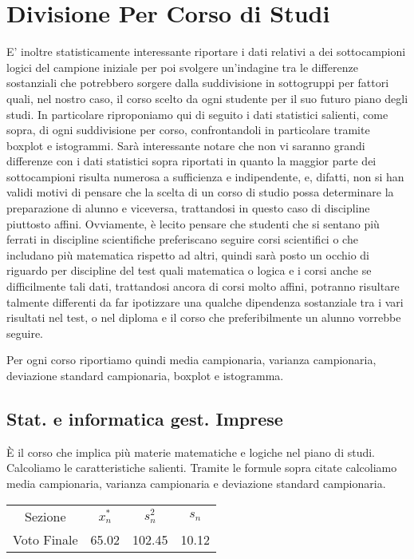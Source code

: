 \section{Divisione Per Corso di Studi}

E’ inoltre statisticamente interessante riportare i dati relativi a dei sottocampioni logici del campione iniziale per poi svolgere un’indagine tra le differenze sostanziali che potrebbero sorgere dalla suddivisione in sottogruppi per fattori quali, nel nostro caso, il corso scelto da ogni studente per il suo futuro piano degli studi.  In particolare riproponiamo qui di seguito i dati statistici salienti, come sopra, di ogni suddivisione per corso, confrontandoli in particolare tramite boxplot e istogrammi. Sarà interessante notare che non vi saranno grandi differenze con i dati statistici sopra riportati in quanto la maggior parte dei sottocampioni risulta numerosa a sufficienza e indipendente, e, difatti, non si han validi motivi di pensare che la scelta di un corso di studio possa determinare la preparazione di alunno e  viceversa, trattandosi in questo caso di discipline piuttosto affini. Ovviamente, è lecito pensare che studenti che si sentano più ferrati in discipline scientifiche preferiscano seguire corsi scientifici o che includano più matematica rispetto ad altri, quindi sarà posto un occhio di riguardo per discipline del test quali matematica o logica e i corsi anche se difficilmente tali dati, trattandosi ancora di corsi molto affini, potranno risultare talmente differenti da far ipotizzare una qualche dipendenza sostanziale tra i vari risultati nel test, o nel diploma e il corso che preferibilmente un alunno vorrebbe seguire. 

Per ogni corso riportiamo quindi media campionaria, varianza campionaria, deviazione standard campionaria, boxplot e istogramma.
\clearpage
\thispagestyle{empty} %
\subsection{Stat. e informatica gest. Imprese}

È il corso che implica più materie matematiche e logiche  nel piano di studi.
Calcoliamo le caratteristiche salienti.
Tramite le formule sopra citate calcoliamo media campionaria, varianza campionaria e deviazione standard campionaria.

\begin{center}
\begin{tabular}{cccc}
  \toprule
  Sezione & \(x_{n}^{*}\) & \(s_n^2\) & \(s_n\) \\
  Voto Finale & 65.02 & 102.45 & 10.12 \\
  \bottomrule
\end{tabular}
\end{center}

